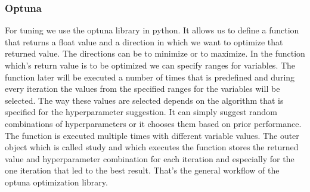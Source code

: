 \documentclass[a4paper,12pt]{report}
\begin{document}
				\subsubsection{Optuna}
For tuning we use the optuna library in python. It allows us to define a function that returns a float value and a direction in which we want to optimize that returned value. The directions can be to minimize or to maximize. 
In the function which’s return value is to be optimized we can specify ranges for variables. The function later will be executed a number of times that is predefined and during every iteration the values from the specified ranges for the variables will be selected. The way these values are selected depends on the algorithm that is specified for the hyperparameter suggestion. It can simply suggest random combinations of hyperparameters or it chooses them based on prior performance.
The function is executed multiple times with different variable values. The outer object which is called study and which executes the function stores the returned value and hyperparameter combination for each iteration and especially for the one iteration that led to the best result. That’s the general workflow of the optuna optimization library.\\
\end{document}
